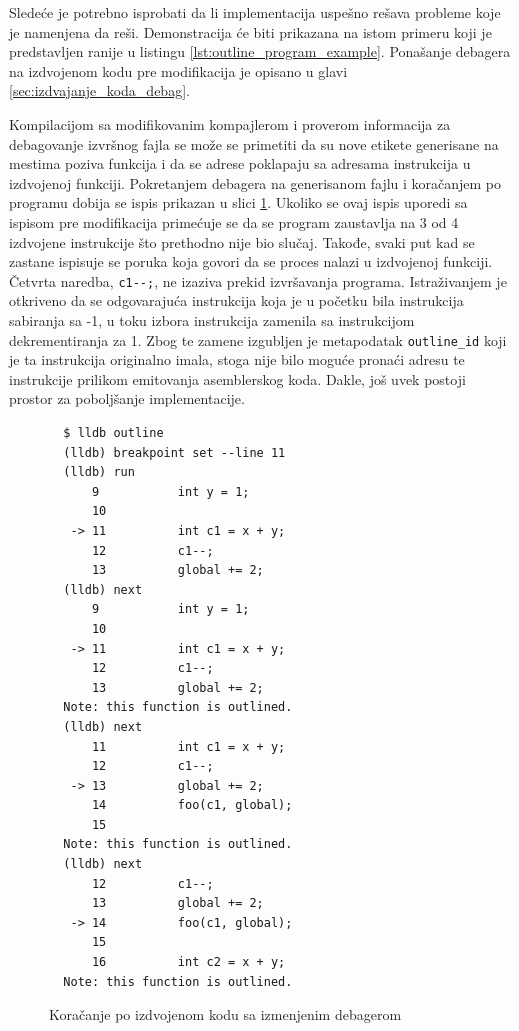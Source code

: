 \documentclass[12pt,oneside]{memoir}
\begin{document}
Sledeće je potrebno isprobati da li implementacija uspešno rešava probleme koje je namenjena da reši.
Demonstracija će biti prikazana na istom primeru koji je predstavljen ranije u listingu \ref{lst:outline_program_example}.
Ponašanje debagera na izdvojenom kodu pre modifikacija je opisano u glavi \ref{sec:izdvajanje_koda_debag}.

Kompilacijom sa modifikovanim kompajlerom i proverom informacija za debagovanje izvršnog fajla se može se primetiti da su nove etikete generisane na mestima poziva funkcija i da se adrese poklapaju sa adresama instrukcija u izdvojenoj funkciji.
Pokretanjem debagera na generisanom fajlu i koračanjem po programu dobija se ispis prikazan u slici \ref{lst:outlining_debug_step_after}.
Ukoliko se ovaj ispis uporedi sa ispisom pre modifikacija primećuje se da se program zaustavlja na 3 od 4 izdvojene instrukcije što prethodno nije bio slučaj.
Takođe, svaki put kad se zastane ispisuje se poruka koja govori da se proces nalazi u izdvojenoj funkciji.
Četvrta naredba, \verb|c1--;|, ne izaziva prekid izvršavanja programa.
Istraživanjem je otkriveno da se odgovarajuća instrukcija koja je u početku bila instrukcija sabiranja sa -1, u toku izbora instrukcija zamenila sa instrukcijom dekrementiranja za 1.
Zbog te zamene izgubljen je metapodatak \verb|outline_id| koji je ta instrukcija originalno imala, stoga nije bilo moguće pronaći adresu te instrukcije prilikom emitovanja asemblerskog koda.
% 
Dakle, još uvek postoji prostor za poboljšanje implementacije.

\begin{figure}[!ht]
\begin{verbatim}
  $ lldb outline
  (lldb) breakpoint set --line 11
  (lldb) run
      9           int y = 1;
      10          
   -> 11          int c1 = x + y;
      12          c1--;
      13          global += 2;
  (lldb) next
      9           int y = 1;
      10          
   -> 11          int c1 = x + y;
      12          c1--;
      13          global += 2;
  Note: this function is outlined.
  (lldb) next
      11          int c1 = x + y;
      12          c1--;
   -> 13          global += 2;
      14          foo(c1, global);
      15          
  Note: this function is outlined.
  (lldb) next
      12          c1--;
      13          global += 2;
   -> 14          foo(c1, global);
      15          
      16          int c2 = x + y;
  Note: this function is outlined.
\end{verbatim}
\caption{Koračanje po izdvojenom kodu sa izmenjenim debagerom}
\label{lst:outlining_debug_step_after}
\end{figure}
\end{document}
